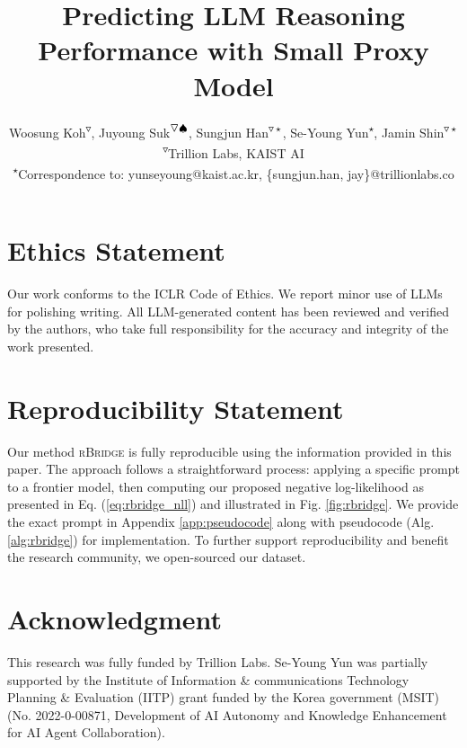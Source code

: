 \documentclass{article} %
\title{Predicting LLM Reasoning Performance with Small Proxy Model}
\author{
  Woosung Koh\textsuperscript{$\triangledown$\scalebox{0.85}{$\spadesuit$}}, 
  Juyoung Suk\textsuperscript{$\triangledown\scalebox{0.85}{$\spadesuit$}$}, 
  Sungjun Han\textsuperscript{$\triangledown\star$}, 
  Se-Young Yun\textsuperscript{\scalebox{0.85}{$\spadesuit$}$\star$},
  Jamin Shin\textsuperscript{$\triangledown \star$}\\
  \textsuperscript{$\triangledown$}Trillion Labs, \textsuperscript{\scalebox{0.85}{$\spadesuit$}}KAIST AI\\
  \footnotesize{\textsuperscript{$\star$}Correspondence to: yunseyoung@kaist.ac.kr, \{sungjun.han, jay\}@trillionlabs.co}
}
\theoremstyle{plain}
\newcommand{\tsc}[1]{\textsc{#1}}
\begin{document}
\maketitle

 






\newpage
\section{Ethics Statement} \label{app:ethic}
Our work conforms to the ICLR Code of Ethics. We report minor use of LLMs for polishing writing. All LLM-generated content has been reviewed and verified by the authors, who take full responsibility for the accuracy and integrity of the work presented.

\section{Reproducibility Statement} \label{app:reproduce}
Our method \tsc{rBridge} is fully reproducible using the information provided in this paper. The approach follows a straightforward process: applying a specific prompt to a frontier model, then computing our proposed negative log-likelihood as presented in Eq. (\ref{eq:rbridge_nll}) and illustrated in Fig. \ref{fig:rbridge}. We provide the exact prompt in  Appendix \ref{app:pseudocode} along with pseudocode (Alg. \ref{alg:rbridge}) for implementation. To further support reproducibility and benefit the research community, we open-sourced our dataset.

\section{Acknowledgment} 
This research was fully funded by Trillion Labs. Se-Young Yun was partially supported by the Institute of Information \& communications Technology Planning \& Evaluation (IITP) grant funded by the Korea government (MSIT) (No. 2022-0-00871, Development of AI Autonomy and Knowledge Enhancement for AI Agent Collaboration).




\newpage
\appendix

\end{document}
